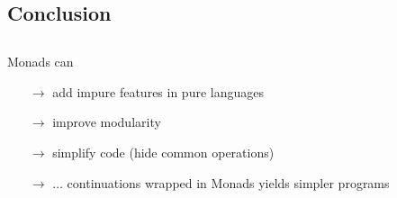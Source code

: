\documentclass{beamer}
\begin{document}

\begin{frame}[fragile]
\section{Conclusion}
\subsection{}
Monads can
\begin{itemize}
\item[$\rightarrow$] add impure features in pure languages
\item[$\rightarrow$] improve modularity
\item[$\rightarrow$] simplify code (hide common operations)
\item[$\rightarrow$] $\dots$ continuations wrapped in Monads yields
  simpler programs
\end{itemize}
\end{frame}
\end{document}
